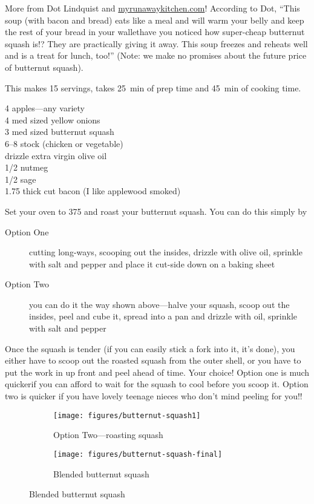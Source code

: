 \begin{open}
    More from Dot Lindquist and \url{myrunawaykitchen.com}! According to Dot, ``This soup (with bacon and bread) eats like a meal and will warm your belly and keep the rest of your bread in your wallet\textellipsis have you noticed how super-cheap butternut squash is!?  They are practically giving it away.  This soup freezes and reheats well and is a treat for lunch, too!'' (Note: we make no promises about the future price of butternut squash).

    This makes 15 servings, takes \SI{25}{\minute} of prep time and \SI{45}{\minute} of cooking time.
\end{open}
\begin{ingredients}
    4  apples---any variety\\
    4  med sized yellow onions\\
    3  med sized butternut squash\\
    \SIrange{6}{8}{\cup} stock (chicken or vegetable)\\
    drizzle  extra virgin olive oil\\
    \SI{1/2}{\teaspoon}  nutmeg\\
    \SI{1/2}{\teaspoon}  sage\\
    \SI{1.75}{\pound} thick cut bacon (I like applewood smoked)
\end{ingredients}
Set your oven to \SI{375}{\degreeF} and roast your butternut squash. You can do
this simply by
\begin{description}
    \item[Option One] cutting long-ways, scooping out the insides, drizzle with
    olive oil, sprinkle with salt and pepper and place it cut-side down on a
    baking sheet
    \item[Option Two] you can do it the way shown above---halve
    your squash, scoop out the insides, peel and cube it, spread into a pan and
    drizzle with oil, sprinkle with salt and pepper
\end{description}
Once the squash is tender (if you can easily stick a fork into it, it's done), you either have to scoop out the roasted squash from the outer shell, or you have to put the work in up front and peel ahead of time. Your choice! Option one is much quicker\textellipsis if you can afford to wait for the squash to cool before you scoop it. Option two is quicker if you have lovely teenage nieces who don't mind peeling for you!!%
\begin{figure}
    \centering
    \begin{subfigure}{0.3\textwidth}
        \centering
        \texttt{[image: figures/butternut-squash1]}
        \caption*{Option Two---roasting squash}
    \end{subfigure}
    \begin{subfigure}{0.525\textwidth}
        \centering
        \texttt{[image: figures/butternut-squash-final]}
        \caption*{Blended butternut squash}
    \end{subfigure}
\end{figure}

